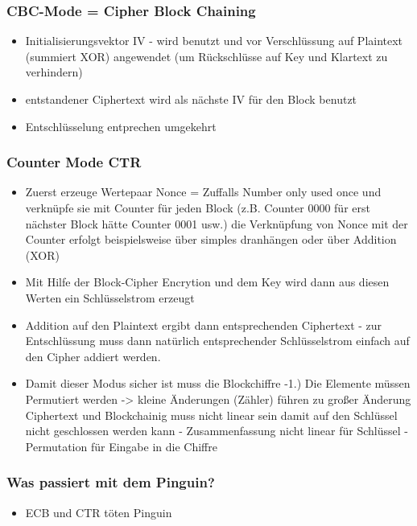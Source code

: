 \documentclass[a4paper,10pt]{scrartcl}
\begin{document}
      \subsubsection{CBC-Mode = Cipher Block Chaining}

   \begin{itemize}
    \item Initialisierungsvektor IV - wird benutzt und vor Verschlüssung auf Plaintext (summiert XOR) angewendet (um Rückschlüsse auf Key und Klartext zu verhindern)
    \item entstandener Ciphertext wird als nächste IV für den Block benutzt
    \item Entschlüsselung entprechen umgekehrt
   \end{itemize}

  
      \subsubsection{Counter Mode CTR}
      
      \begin{itemize}
       \item Zuerst erzeuge Wertepaar Nonce = Zuffalls Number only used once und verknüpfe sie mit Counter für jeden Block (z.B. Counter 0000 für erst nächster Block hätte Counter
       0001 usw.) die Verknüpfung von Nonce mit der Counter erfolgt beispielsweise über simples dranhängen oder über Addition (XOR)
       \item Mit Hilfe der Block-Cipher Encrytion und dem Key wird dann aus diesen Werten ein Schlüsselstrom erzeugt
       \item Addition auf den Plaintext ergibt dann entsprechenden Ciphertext - zur Entschlüssung muss dann natürlich entsprechender Schlüsselstrom einfach
       auf den Cipher addiert werden.
       \item Damit dieser Modus sicher ist muss die Blockchiffre -1.) Die Elemente müssen Permutiert werden -> kleine Änderungen (Zähler) führen zu großer Änderung Ciphertext und
       Blockchainig muss nicht linear sein damit auf den Schlüssel nicht geschlossen werden kann - Zusammenfassung nicht linear für Schlüssel - Permutation für Eingabe in die Chiffre
      \end{itemize}
      
      \subsubsection{Was passiert mit dem Pinguin?}
      \begin{itemize}
       \item ECB und CTR töten Pinguin
      \end{itemize}
\end{document}
